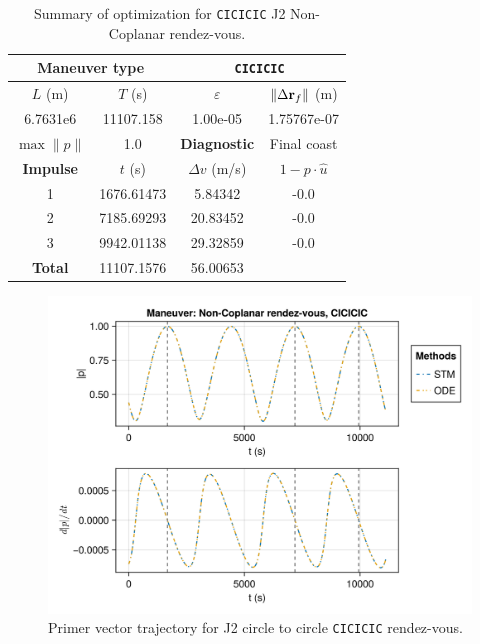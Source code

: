 \begin{table}[htpb]
    \centering
    \begin{tabular}{cccc} \toprule
    \multicolumn{2}{c}{\textbf{Maneuver type}} & \multicolumn{2}{c}{\texttt{CICICIC}} \\ \midrule
    \(L\) (m) & \(T\) (s) & \(\varepsilon\) & \(\lVert \Delta \mathbf{r}_{f} \rVert\) (m)    \\ \midrule
    6.7631e6          & 11107.158          & 1.00e-05                & 1.75767e-07                        \\ \midrule
    \(\max \lVert p \rVert\) & 1.0     & \textbf{Diagnostic}   & Final coast        \\ \midrule
    \textbf{Impulse} & \(t\) (s) & \(\Delta v\) (m/s) & \(1 - p \cdot \hat{u}\) \\ \midrule
    1                 & 1676.61473          & 5.84342             & -0.0                    \\
    2                 & 7185.69293          & 20.83452             & -0.0                    \\
    3                 & 9942.01138          & 29.32859             & -0.0                    \\\midrule
    \textbf{Total}   & 11107.1576          & 56.00653             &                     \\ \bottomrule   
    \end{tabular}
    \caption{Summary of optimization for \texttt{CICICIC} J2 Non-Coplanar rendez-vous.}
    \label{tab:J2_nr_CICICIC_tab}
\end{table}

\begin{figure}[htbp]
    \centering
    \includegraphics[width=0.7\linewidth]{../results/j2/ipv_noncop/CICICIC_primer_vector.png}
    \caption{Primer vector trajectory for J2 circle to circle \texttt{CICICIC} rendez-vous.}
    \label{fig:j2_ncop_CICICIC_pv}
\end{figure}

